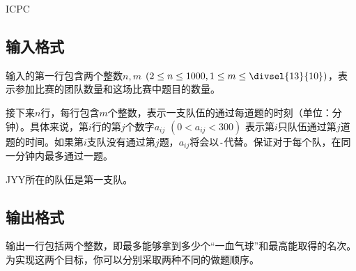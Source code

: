 \begin{Problem}{ICPC}{}
\subsection*{输入格式}

输入的第一行包含两个整数$n, m$ $(2 \leq n \leq 1000, 1 \leq m \leq \divsel{13}{10})$，表示参加比赛的团队数量和这场比赛中题目的数量。

接下来$n$行，每行包含$m$个整数，表示一支队伍的通过每道题的时刻（单位：分钟）。具体来说，第$i$行的第$j$个数字$a_{ij}$ $(0 < a_{ij} < 300)$ 表示第$i$只队伍通过第$j$道题的时间。如果第$i$支队没有通过第$j$题，$a_{ij}$将会以\texttt{-}代替。保证对于每个队，在同一分钟内最多通过一题。

JYY所在的队伍是第一支队。

\subsection*{输出格式}

输出一行包括两个整数，即最多能够拿到多少个“一血气球”和最高能取得的名次。为实现这两个目标，你可以分别采取两种不同的做题顺序。


\end{Problem}

